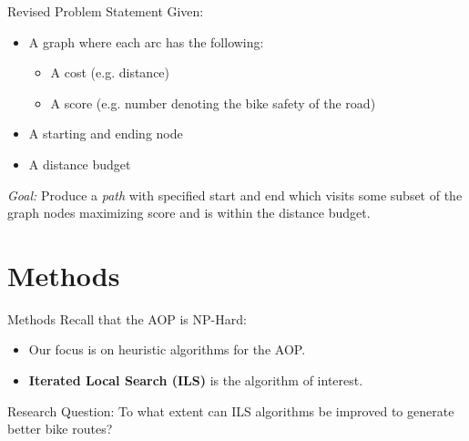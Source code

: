 \documentclass{beamer}
\begin{document}
\begin{frame}{Revised Problem Statement}
Given:
\begin{itemize}
    \item A graph where each arc has the following:
    \begin{itemize}
        \item A cost (e.g. distance)
        \item A score (e.g. number denoting the bike safety of the road)
    \end{itemize}
    \item A starting and ending node
    \item A distance budget
\end{itemize}
\emph{Goal:} Produce a \emph{path} with specified start and end which visits some subset of the graph nodes maximizing score and is within the distance budget.
\end{frame}

\section{Methods}
\begin{frame}{Methods}
    Recall that the AOP is NP-Hard:
    \begin{itemize}
        \item Our focus is on heuristic algorithms for the AOP.
        \item \textbf{Iterated Local Search (ILS)} is the algorithm of interest.
    \end{itemize}
    
    \begin{alertblock}{Research Question:}
        To what extent can ILS algorithms be improved to generate better bike routes?
    \end{alertblock}

\end{frame}
\end{document}
